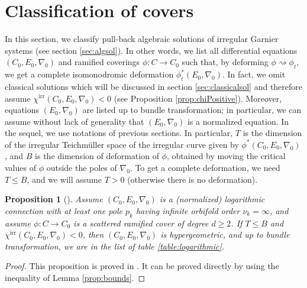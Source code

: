 \documentclass[12]{amsart}
\newtheorem{prop}[thm]{Proposition}
\begin{document}
\section{Classification of covers}\label{sec:Classifcover}

In this section, we classify pull-back algebraic solutions of irregular Garnier systems
(see section \ref{sec:algsol}). In other words,
we list all differential equations $(C_0,E_0,\nabla_0)$ and ramified coverings $\phi:C\to C_0$
such that, by deforming $\phi\rightsquigarrow\phi_t$, we get a complete isomonodromic deformation $\phi_t^*(E_0,\nabla_0)$.
In fact, we omit classical solutions which will be discussed in section \ref{sec:classicalsol}
and therefore assume $\chi^{\mathrm{irr}}(C_0,E_0,\nabla_0)<0$ (see Proposition \ref{prop:chiPositive}).
Moreover, equations $(E_0,\nabla_0)$ are listed up to bundle transformation;
in particular, we can assume without lack of generality that $(E_0,\nabla_0)$ is a normalized equation.
In the sequel, we use notations of previous sections. In particular, 
$T$ is the dimension of the irregular Teichm\"uller space of the irregular curve
given by $\phi^*(C_0,E_0,\nabla_0)$, and $B$ is the dimension of deformation 
of $\phi$, obtained by moving the critical values of $\phi$ outside the poles of $\nabla_0$.
To get a complete deformation, we need $T\le B$, and we will assume $T>0$ (otherwise there is no deformation).


\begin{prop}[\cite{Diarra1}]\label{Prop:DiarraPullBack}
Assume $(C_0,E_0,\nabla_0)$ is a (normalized) logarithmic connection
with at least one pole $p_k$ having infinite orbifold order $\nu_k=\infty$, and assume 
$\phi:C\to C_0$ is a scattered ramified cover of degree $d\ge 2$. If $T\le B$ and
$\chi^{\mathrm{irr}}(C_0,E_0,\nabla_0)<0$, then $(C_0,E_0,\nabla_0)$ is hypergeometric,
and up to bundle transformation, we are
in the list of table \ref{table:logarithmic}.
\end{prop}

\begin{proof}This proposition is proved in \cite[second table, page 142]{Diarra1}. It can
be proved directly by using the inequality of Lemma \ref{prop:bounds}.
\end{proof}
\end{document}
